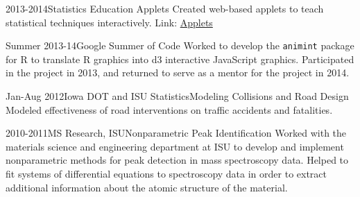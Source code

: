 \documentclass[10pt]{tccv}
\begin{document}
\begin{eventlist}
\item{2013-2014}{\phantom{ISU}}{Statistics Education Applets\vspace{-14pt}}{
Created web-based applets to teach statistical techniques interactively. 
Link: \href{http://vanderplas.dyndns-remote.com:3838/}{Applets}}
% 

\item{Summer 2013-14}{\phantom{R Project}}{Google Summer of Code}{
Worked to develop the \texttt{animint} package for R to translate R graphics into d3 interactive JavaScript graphics. Participated in the project in 2013, and returned to serve as a mentor for the project in 2014.}


\item{Jan-Aug 2012}{Iowa DOT and ISU Statistics}{Modeling Collisions and Road Design}{
Modeled effectiveness of road interventions on traffic accidents and fatalities. 
}

\item{2010-2011}{MS Research, ISU}{Nonparametric Peak Identification}{
Worked with the materials science and engineering department at ISU to develop and implement nonparametric methods for peak detection in mass spectroscopy data.
Helped to fit systems of differential equations to spectroscopy data in order to extract additional information about the atomic structure of the material. 
}

% 
\end{eventlist}
% 
% 
% 
\end{document}
